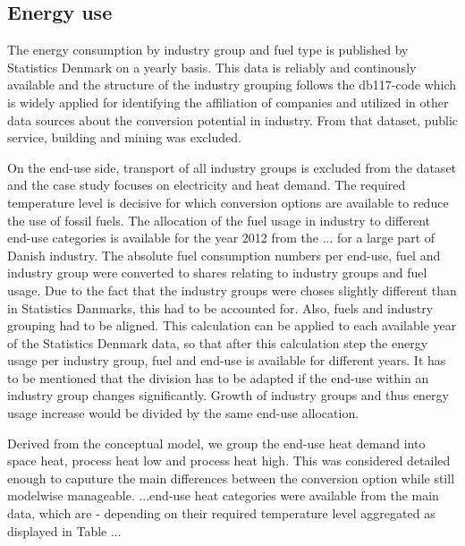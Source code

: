 \documentclass[review]{elsarticle}
\begin{document}

\subsection{Energy use}
The energy consumption by industry group and fuel type is published by Statistics Denmark on a yearly basis. This data is reliably and continously available and the structure of the industry grouping follows the db117-code which is widely applied for identifying the affiliation of companies and utilized in other data sources about the conversion potential in industry. From that dataset, public service, building and mining was excluded.

On the end-use side, transport of all industry groups is excluded from the dataset and the case study focuses on electricity and heat demand. The required temperature level is decisive for which conversion options are available to reduce the use of fossil fuels. The allocation of the fuel usage in industry to different end-use categories is available for the year 2012 from the ... for a large part of Danish industry. The absolute fuel consumption numbers per end-use, fuel and industry group were converted to shares relating to industry groups and fuel usage. Due to the fact that the industry groups were choses slightly different than in Statistics Danmarks, this had to be accounted for. Also, fuels and industry grouping had to be aligned. This calculation can be applied to each available year of the Statistics Denmark data, so that after this calculation step the energy usage per industry group, fuel and end-use is available for different years. It has to be mentioned that the division has to be adapted if the end-use within an industry group changes significantly. Growth of industry groups and thus energy usage increase would be divided by the same end-use allocation.

Derived from the conceptual model, we group the end-use heat demand into space heat, process heat low and process heat high. This was considered detailed enough to caputure the main differences between the conversion option while still modelwise manageable. ...end-use heat categories were available from the main data, which are - depending on their required temperature level aggregated as displayed in Table ...
\end{document}
